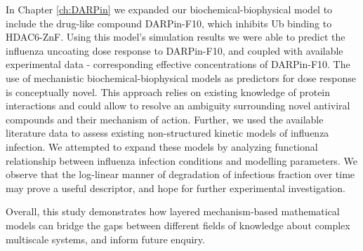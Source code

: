 In Chapter \ref{ch:DARPin} we expanded our biochemical-biophysical model to include the drug-like compound DARPin-F10, which inhibits Ub binding to HDAC6-ZnF. Using this model's simulation results we were able to predict the influenza uncoating dose response to DARPin-F10, and coupled with available experimental data - corresponding effective concentrations of DARPin-F10. The use of mechanistic biochemical-biophysical models as predictors for dose response is conceptually novel. This approach relies on existing knowledge of protein interactions and could allow to resolve an ambiguity surrounding novel antiviral compounds and their mechanism of action. Further, we used the available literature data \cite{rudiger2019multiscale, schulze2009infection} to assess existing non-structured kinetic models of influenza infection. We attempted to expand these models by analyzing functional relationship between influenza infection conditions and modelling parameters. We observe that the log-linear manner of degradation of infectious fraction over time may prove a useful descriptor, and hope for further experimental investigation. 

Overall, this study demonstrates how layered mechanism-based mathematical models can bridge the gaps between different fields of knowledge about complex multiscale systems, and inform future enquiry.